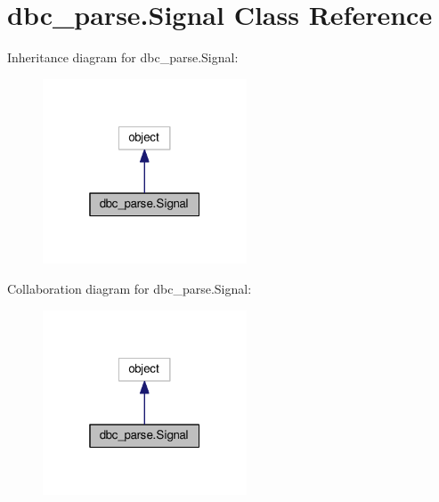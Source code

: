 \hypertarget{classdbc__parse_1_1Signal}{}\section{dbc\+\_\+parse.\+Signal Class Reference}
\label{classdbc__parse_1_1Signal}


Inheritance diagram for dbc\+\_\+parse.\+Signal\+:\nopagebreak
\begin{figure}[H]
\begin{center}
\leavevmode
\includegraphics[width=172pt]{db/d5f/classdbc__parse_1_1Signal__inherit__graph}
\end{center}
\end{figure}


Collaboration diagram for dbc\+\_\+parse.\+Signal\+:\nopagebreak
\begin{figure}[H]
\begin{center}
\leavevmode
\includegraphics[width=172pt]{d0/d14/classdbc__parse_1_1Signal__coll__graph}
\end{center}
\end{figure}
